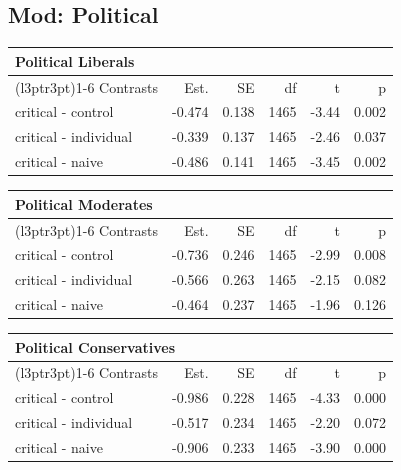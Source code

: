 \documentclass[
]{book}
\begin{document}
\hypertarget{mod-political-7}{%
\subsection{Mod: Political}\label{mod-political-7}}

\begin{table}
\centering
\fontsize{13}{15}\selectfont
\begin{tabular}{lrrrrr}
\toprule
\multicolumn{6}{l}{Political Liberals} \\
\cmidrule(l{3pt}r{3pt}){1-6}
Contrasts & Est. & SE & df & t & p\\
\midrule
critical - control & -0.474 & 0.138 & 1465 & -3.44 & 0.002\\
critical - individual & -0.339 & 0.137 & 1465 & -2.46 & 0.037\\
critical - naive & -0.486 & 0.141 & 1465 & -3.45 & 0.002\\
\bottomrule
\end{tabular}
\end{table}

\begin{table}
\centering
\fontsize{13}{15}\selectfont
\begin{tabular}{lrrrrr}
\toprule
\multicolumn{6}{l}{Political Moderates} \\
\cmidrule(l{3pt}r{3pt}){1-6}
Contrasts & Est. & SE & df & t & p\\
\midrule
critical - control & -0.736 & 0.246 & 1465 & -2.99 & 0.008\\
critical - individual & -0.566 & 0.263 & 1465 & -2.15 & 0.082\\
critical - naive & -0.464 & 0.237 & 1465 & -1.96 & 0.126\\
\bottomrule
\end{tabular}
\end{table}

\begin{table}
\centering
\fontsize{13}{15}\selectfont
\begin{tabular}{lrrrrr}
\toprule
\multicolumn{6}{l}{Political Conservatives} \\
\cmidrule(l{3pt}r{3pt}){1-6}
Contrasts & Est. & SE & df & t & p\\
\midrule
critical - control & -0.986 & 0.228 & 1465 & -4.33 & 0.000\\
critical - individual & -0.517 & 0.234 & 1465 & -2.20 & 0.072\\
critical - naive & -0.906 & 0.233 & 1465 & -3.90 & 0.000\\
\bottomrule
\end{tabular}
\end{table}
\end{document}
